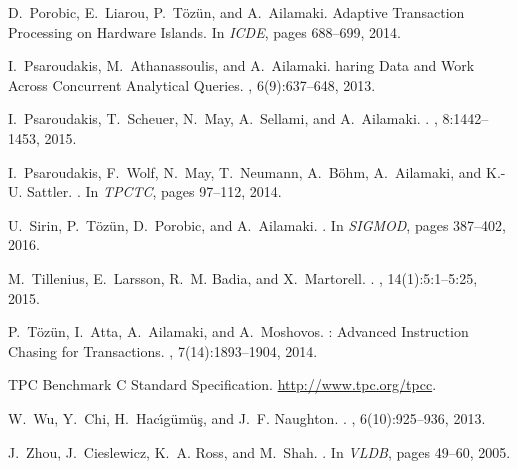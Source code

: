 \documentclass[11pt,dvipdfm]{article}
\begin{document}
\begin{thebibliography}{10}
\begin{small}
D.~Porobic, E.~Liarou, P.~T\"oz\"un, and A.~Ailamaki.
 {A}daptive {T}ransaction {P}rocessing on {H}ardware
  {I}slands.
\newblock In {\em ICDE}, pages 688--699, 2014.

I.~Psaroudakis, M.~Athanassoulis, and A.~Ailamaki.
haring {D}ata and {W}ork {A}cross {C}oncurrent {A}nalytical
  {Q}ueries.
, 6(9):637--648, 2013.

I.~Psaroudakis, T.~Scheuer, N.~May, A.~Sellami, and A.~Ailamaki.
.
, 8:1442--1453, 2015.

I.~Psaroudakis, F.~Wolf, N.~May, T.~Neumann, A.~B{\"o}hm, A.~Ailamaki, and
  K.-U. Sattler.
.
\newblock In {\em TPCTC}, pages 97--112, 2014.

U.~Sirin, P.~T{\"{o}}z{\"{u}}n, D.~Porobic, and A.~Ailamaki.
.
\newblock In {\em SIGMOD}, pages 387--402, 2016.

M.~Tillenius, E.~Larsson, R.~M. Badia, and X.~Martorell.
.
, 14(1):5:1--5:25, 2015.

P.~T\"oz\"un, I.~Atta, A.~Ailamaki, and A.~Moshovos.
: {A}dvanced {I}nstruction {C}hasing for {T}ransactions.
, 7(14):1893--1904, 2014.

{TPC} {B}enchmark {C} {S}tandard {S}pecification.
\newblock \url{http://www.tpc.org/tpcc}.

W.~Wu, Y.~Chi, H.~Hac\'{\i}g\"{u}m\"{u}\c{s}, and J.~F. Naughton.
.
, 6(10):925--936, 2013.

J.~Zhou, J.~Cieslewicz, K.~A. Ross, and M.~Shah.
.
\newblock In {\em VLDB}, pages 49--60, 2005.
\end{small}
\end{thebibliography} 
\end{document}
